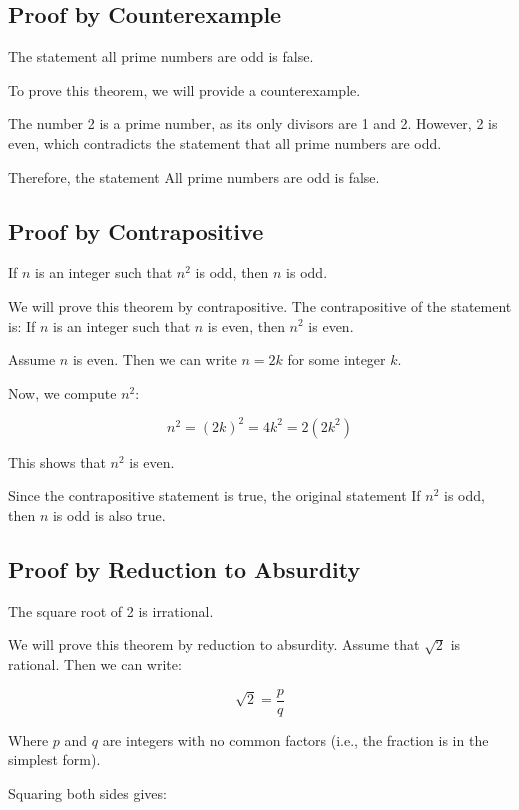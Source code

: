 \QED

\subsection{Proof by Counterexample}

The statement all prime numbers are odd is false.

To prove this theorem, we will provide a counterexample.

The number 2 is a prime number, as its only divisors are 1 and 2. However, 2 is 
even, which contradicts the statement that all prime numbers are odd.

Therefore, the statement All prime numbers are odd is false.
\QED

\subsection{Proof by Contrapositive}

If \(n\) is an integer such that \( n^2 \) is odd, then \(n\) is odd.

We will prove this theorem by contrapositive. The contrapositive of the statement is: If \(n\) is an 
integer such that \(n\) is even, then \( n^2 \) is even.

Assume \(n\) is even. Then we can write \( n = 2k \) for some integer \(k\).

Now, we compute \( n^2 \):
	
\[
	n^2 = {(2k)}^2 = 4k^2 = 2(2k^2)
\]

This shows that \( n^2 \) is even.

Since the contrapositive statement is true, the original statement If \( n^2 \) is odd, then \(n\) is 
odd is also true.

\QED

\subsection{Proof by Reduction to Absurdity}

The square root of 2 is irrational.

We will prove this theorem by reduction to absurdity. Assume that \( \sqrt{2} \) is rational. Then we can 
write:

\[
	\sqrt{2} = \frac{p}{q}
\]

Where \(p\) and \(q\) are integers with no common factors (i.e., the fraction is in the simplest 
form).

Squaring both sides gives:

